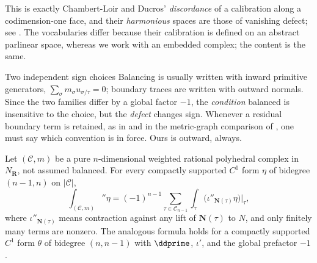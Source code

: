 This is exactly Chambert-Loir and Ducros' \emph{discordance} of a calibration
along a codimension-one face, and their \emph{harmonious} spaces are those
of vanishing defect; see \cite[\S\S4.6.7--4.6.12]{CLD25}.  The vocabularies
differ because their calibration is defined on an abstract parlinear space,
whereas we work with an embedded complex; the content is the same.

\begin{warning}{Two independent sign choices}
Balancing is usually written with inward primitive generators,
$\sum_\sigma m_\sigma u_{\sigma/\tau}=0$; boundary traces are written with
outward normals.  Since the two families differ by a global factor $-1$,
the \emph{condition} balanced is insensitive to the choice, but the
\emph{defect} changes sign.  Whenever a residual boundary term is retained,
as in  and in the metric-graph comparison of
, one must say which convention is in force.  Ours
is outward, always.
\end{warning}

\begin{theorem}
\label{thm:ch11-defect-stokes}
Let $(\mathscr C,m)$ be a pure $n$-dimensional weighted rational polyhedral
complex in $N_{\mathbf R}$, not assumed balanced.  For every compactly
supported $C^1$ form $\eta$ of bidegree $(n-1,n)$ on $|\mathscr C|$,
\begin{equation}
\label{eq:ch11-defect-stokes}
 \int_{(\mathscr C,m)}\dprime\eta
 =(-1)^{n-1}\sum_{\tau\in\mathscr C_{n-1}}
   \int_\tau\bigl(\iota''_{\mathbf N(\tau)}\eta\bigr)\big|_\tau ,
\end{equation}
where $\iota''_{\mathbf N(\tau)}$ means contraction against any lift of
$\mathbf N(\tau)$ to $N$, and only finitely many terms are nonzero.  The
analogous formula holds for a compactly supported $C^1$ form $\theta$ of
bidegree $(n,n-1)$ with $\ddprime$,
$\iota'$, and the global prefactor $-1$.
\end{theorem}

